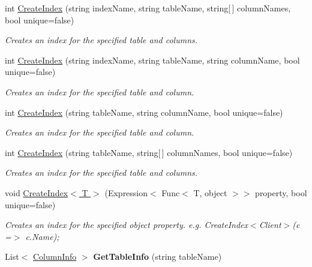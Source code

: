 \begin{DoxyCompactItemize}
int \hyperlink{classSQLite_1_1SQLiteConnection_a006cda01a29a2f202be1659cbf3810a8}{Create\+Index} (string index\+Name, string table\+Name, string\mbox{[}$\,$\mbox{]} column\+Names, bool unique=false)
\begin{DoxyCompactList}\small\item\em Creates an index for the specified table and columns. \end{DoxyCompactList}\item 
int \hyperlink{classSQLite_1_1SQLiteConnection_a41bc451f0fed96a6cb79ae2d61ab3a11}{Create\+Index} (string index\+Name, string table\+Name, string column\+Name, bool unique=false)
\begin{DoxyCompactList}\small\item\em Creates an index for the specified table and column. \end{DoxyCompactList}\item 
int \hyperlink{classSQLite_1_1SQLiteConnection_a91adc40b863214a5efc495b33ec9a351}{Create\+Index} (string table\+Name, string column\+Name, bool unique=false)
\begin{DoxyCompactList}\small\item\em Creates an index for the specified table and column. \end{DoxyCompactList}\item 
int \hyperlink{classSQLite_1_1SQLiteConnection_a30996f7f4a91d17d719ef4dd582b4cee}{Create\+Index} (string table\+Name, string\mbox{[}$\,$\mbox{]} column\+Names, bool unique=false)
\begin{DoxyCompactList}\small\item\em Creates an index for the specified table and columns. \end{DoxyCompactList}\item 
void \hyperlink{classSQLite_1_1SQLiteConnection_a7283c295b89b54728d7201e0812ccaac}{Create\+Index$<$ T $>$} (Expression$<$ Func$<$ T, object $>$$>$ property, bool unique=false)
\begin{DoxyCompactList}\small\item\em Creates an index for the specified object property. e.\+g. Create\+Index$<$\+Client$>$(c =$>$ c.\+Name); \end{DoxyCompactList}\item 
\hypertarget{classSQLite_1_1SQLiteConnection_a695bad5670f4d38a9aae39e4aec85329}{}List$<$ \hyperlink{classSQLite_1_1SQLiteConnection_1_1ColumnInfo}{Column\+Info} $>$ {\bfseries Get\+Table\+Info} (string table\+Name)\label{classSQLite_1_1SQLiteConnection_a695bad5670f4d38a9aae39e4aec85329}


\end{DoxyCompactItemize}
